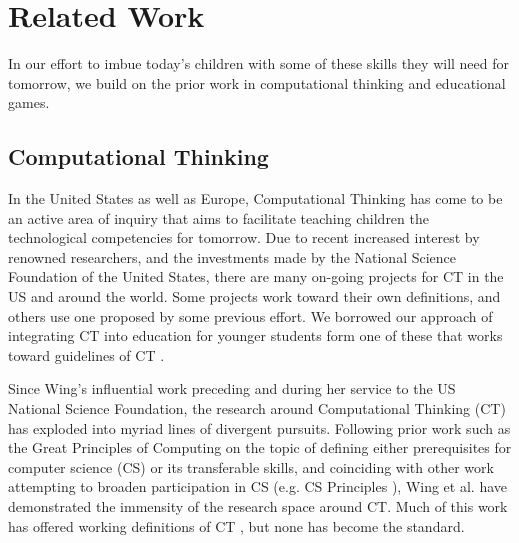 \documentclass{acm_proc_article-sp}
\begin{document}


\section{\sloppy Related Work}
\label{sec:ed_games}
In our effort to imbue today's children with some of these skills they will need for tomorrow, we build on the prior work in computational thinking and educational games.

\subsection{Computational Thinking}
\label{sec:computational_thinking}

In the United States as well as Europe, Computational Thinking has come to be an active area of inquiry that aims to facilitate teaching children the technological competencies for tomorrow.
Due to recent increased interest by renowned researchers, and the investments made by the National Science Foundation of the United States, there are many on-going projects for CT in the US and around the world. 
Some projects work toward their own definitions, and others use one proposed by some previous effort. We borrowed our approach of integrating CT into education for younger students form one of these that works toward guidelines of CT \cite{tatarce21}.

Since Wing's influential work preceding \cite{wing2006computational} and during \cite{wing2008computational} her service to the US National Science Foundation, the research around Computational Thinking (CT) has exploded into myriad lines of divergent pursuits. 
Following prior work such as the Great Principles of Computing \cite{denning2003great} on the topic of defining either prerequisites for computer science (CS) or its transferable skills, and coinciding with other work attempting to broaden participation in CS (e.g. CS Principles \cite{csprinciples}), Wing et al. have demonstrated the immensity of the research space around CT. 
Much of this work has offered working definitions of CT \cite{allan2010computational,barr2011bringing,national2010report}, but none has become the standard. 
\end{document}
